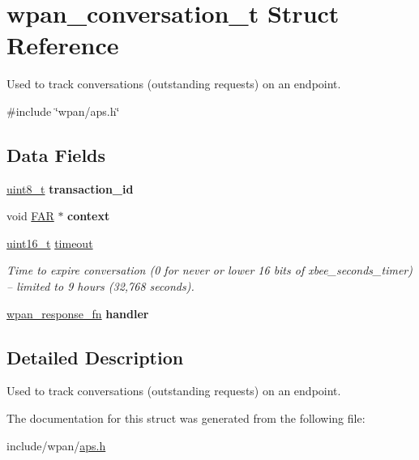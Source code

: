\hypertarget{structwpan__conversation__t}{\section{wpan\-\_\-conversation\-\_\-t Struct Reference}
\label{structwpan__conversation__t}
}


Used to track conversations (outstanding requests) on an endpoint.  




{\ttfamily \#include \char`\"{}wpan/aps.\-h\char`\"{}}

\subsection*{Data Fields}
\begin{DoxyCompactItemize}
\item 
\hypertarget{group__wpan__aps_ga3f721807b5c6f0b5c39977390b5bf408}{\hyperlink{group__hal_gae1affc9ca37cfb624959c866a73f83c2}{uint8\-\_\-t} {\bfseries transaction\-\_\-id}}\label{group__wpan__aps_ga3f721807b5c6f0b5c39977390b5bf408}

\item 
\hypertarget{group__wpan__aps_gaa91f8e864e06077c354e5f5216547758}{void \hyperlink{group__hal_gaef060b3456fdcc093a7210a762d5f2ed}{F\-A\-R} $\ast$ {\bfseries context}}\label{group__wpan__aps_gaa91f8e864e06077c354e5f5216547758}

\item 
\hyperlink{group__hal_ga5a8b2dc9e45a9ee81a94ef304fb62505}{uint16\-\_\-t} \hyperlink{group__wpan__aps_ga7f1ad43d3bf79b40bc39dbb5a6c3a5ae}{timeout}
\begin{DoxyCompactList}\small\item\em Time to expire conversation (0 for never or lower 16 bits of xbee\-\_\-seconds\-\_\-timer) -- limited to 9 hours (32,768 seconds). \end{DoxyCompactList}\item 
\hypertarget{group__wpan__aps_gabc22a182e7dcbd60a04e8a4eb648aaa2}{\hyperlink{group__wpan__aps_gaffe7bb679e9ba6de49f68fdc584fbefb}{wpan\-\_\-response\-\_\-fn} {\bfseries handler}}\label{group__wpan__aps_gabc22a182e7dcbd60a04e8a4eb648aaa2}

\end{DoxyCompactItemize}


\subsection{Detailed Description}
Used to track conversations (outstanding requests) on an endpoint. 

The documentation for this struct was generated from the following file\-:\begin{DoxyCompactItemize}
\item 
include/wpan/\hyperlink{aps_8h}{aps.\-h}\end{DoxyCompactItemize}
